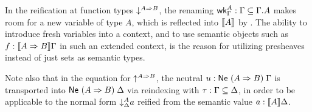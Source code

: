 \documentclass[sigplan,screen,fleqn,review]{acmart} %
\begin{document}
In the reification at function types
$\down{A \To B}$,
the renaming $\twk^A_\Gamma : \Gamma \sublist \cext \Gamma A$
makes room
for a new variable of type $A$, which is reflected into $\den A$ by
.
The ability to introduce fresh variables into a context, and to use
semantic objects such as $f : \den{A \To B}\Gamma$ in such an extended
context, is the reason for utilizing presheaves instead of just sets
as semantic types.

Note also that in the equation for $\up{A \To B}$,
the neutral $u : \Ne {(A \To B)} \Gamma$ is
transported into $\Ne {(A \To B)} \Delta$ via reindexing with
$\tau : \Gamma \sublist \Delta$, in order to be applicable to the normal form
$\down[\Delta]A a$
reified from the semantic value $a : \den A \Delta$.
\end{document}
